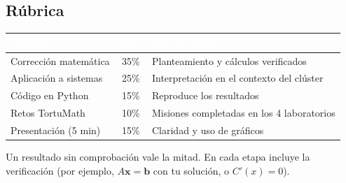 \subsection{R\'ubrica}
\begin{center}
\begin{tabular}{|p{5.8cm}|c|p{5.2cm}|}
\hline
\rowcolor{tmNavy}\textcolor{white}{\textbf{Criterio}} & \textcolor{white}{\textbf{Peso}} & \textcolor{white}{\textbf{Qu\'e se valora}}\\ \hline
Correcci\'on matem\'atica & 35\% & Planteamiento y c\'alculos verificados\\ \hline
Aplicaci\'on a sistemas & 25\% & Interpretaci\'on en el contexto del cl\'uster\\ \hline
C\'odigo en Python & 15\% & Reproduce los resultados\\ \hline
Retos TortuMath & 10\% & Misiones completadas en los 4 laboratorios\\ \hline
Presentaci\'on (5 min) & 15\% & Claridad y uso de gr\'aficos\\ \hline
\end{tabular}
\end{center}

\begin{tmcuidado}Un resultado sin comprobaci\'on vale la mitad. En cada etapa incluye la verificaci\'on (por ejemplo, $A\mathbf x=\mathbf b$ con tu soluci\'on, o $C'(x)=0$).\end{tmcuidado}


